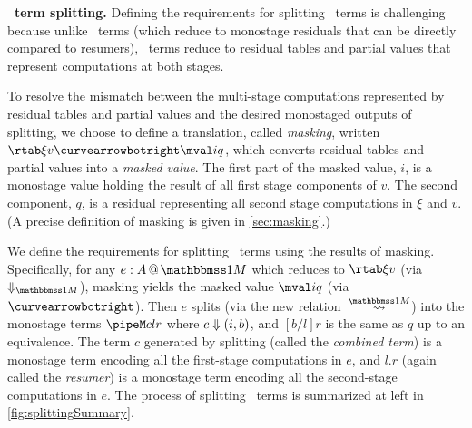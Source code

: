 \begin{abstrsyn}

\textbf{\bbonem\ term splitting.} Defining the requirements for
splitting \bbonem\ terms is challenging because unlike \bbtwo\ terms
(which reduce to monostage residuals that can be directly compared to
resumers), \bbonem\ terms reduce to residual tables and partial values
that represent computations at both stages.

To resolve the mismatch between the multi-stage computations
represented by residual tables and partial values and the desired
monostaged outputs of splitting, we choose to define a translation,
called {\em masking}, written $\rtab \xi v \vsplito \mval i q$, which
converts residual tables and partial values into a {\em masked value}.
The first part of the masked value, $i$, is a monostage value holding
the result of all first stage components of $v$.  The second
component, $q$, is a residual representing all second stage
computations in $\xi$ and $v$. (A precise definition of masking is
given in \ref{sec:masking}.)

We define the requirements for splitting \bbonem\ terms using the
results of masking. Specifically, for any $\colmix e A$ which reduces
to $\rtab \xi v$ (via $\redonesym$), masking yields the masked value
$\mval i q$ (via~$\vsplito$).  Then $e$ splits (via the new
relation~$\splitonesym$) into the monostage terms $\pipeM c l r$ where
${c} \Downarrow {(}i,b)$, and $[b/l]r$ is the same as $q$ up to an
equivalence.  The term $c$ generated by splitting (called the {\em
  combined term}) is a monostage term encoding all the first-stage
computations in $e$, and $l.r$ (again called the {\em resumer}) is a
monostage term encoding all the second-stage computations in $e$.  The
process of splitting \bbonem\ terms is summarized at left in
\ref{fig:splittingSummary}.



\end{abstrsyn}
